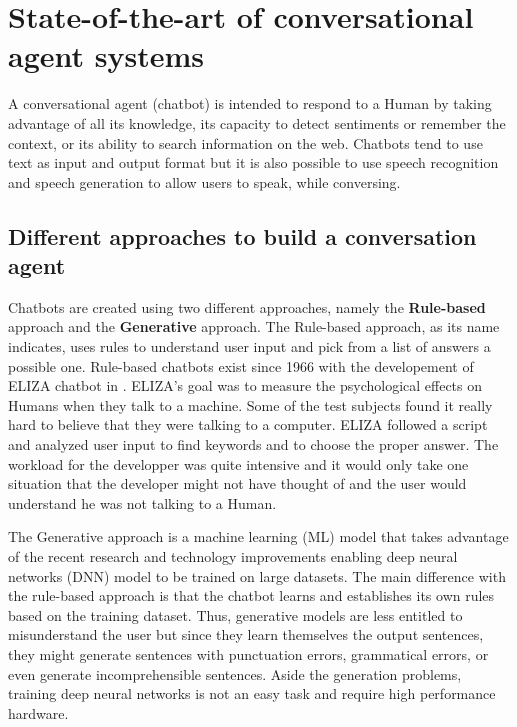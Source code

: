 
\chapter{State-of-the-art of conversational agent systems} %

\label{Chapter2} %

A conversational agent (chatbot) is intended to respond to a Human by taking advantage of all its knowledge, its capacity to detect sentiments or remember the context, or its ability to search information on the web. Chatbots tend to use text as input and output format but it is also possible to use speech recognition and speech generation to allow users to speak, while conversing.

\section{Different approaches to build a conversation agent}
Chatbots are created using two different approaches, namely the \textbf{Rule-based} approach and the \textbf{Generative} approach. The Rule-based approach, as its name indicates, uses rules to understand user input and pick from a list of answers a possible one. Rule-based chatbots exist since 1966 with the developement of ELIZA chatbot in \citet{Weizenbaum:1966:ECP:365153.365168}. ELIZA's goal was to measure the psychological effects on Humans when they talk to a machine. Some of the test subjects found it really hard to believe that they were talking to a computer. ELIZA followed a script and analyzed user input to find keywords and to choose the proper answer. The workload for the developper was quite intensive and it would only take one situation that the developer might not have thought of and the user would understand he was not talking to a Human.

The Generative approach is a machine learning (ML) model that takes advantage of the recent research and technology improvements enabling deep neural networks (DNN) model to be trained on large datasets. The main difference with the rule-based approach is that the chatbot learns and establishes its own rules based on the training dataset. Thus, generative models are less entitled to misunderstand the user but since they learn themselves the output sentences, they might generate sentences with punctuation errors, grammatical errors, or even generate incomprehensible sentences. Aside the generation problems, training deep neural networks is not an easy task and require high performance hardware.

